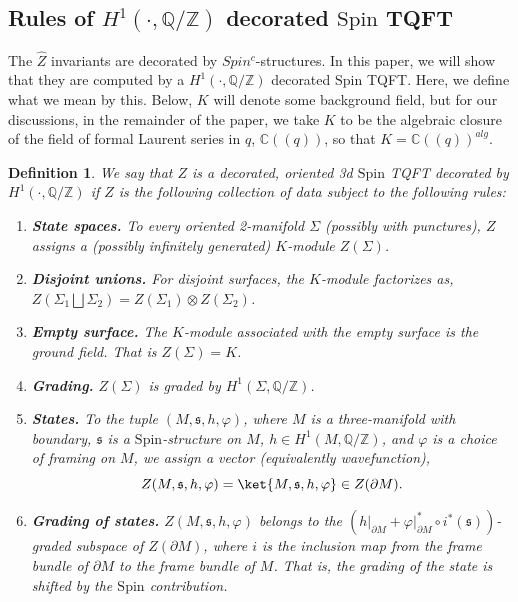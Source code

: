 \documentclass{article}
\newcommand{\Z}{{\mathbb Z}}
\newcommand{\Q}{{\mathbb Q}}
\newtheorem{definition}{Definition}
\numberwithin{corollary}{theorem}
\numberwithin{corollary}{proposition}
\begin{document}


\subsection{Rules of \texorpdfstring{$H^{1}(\cdot, \Q/\Z)$}{H1(.,Q/Z)} decorated \texorpdfstring{$\mathrm{Spin}$}{Spin} TQFT}\label{tqftrules}
The $\hat{Z}$ invariants are decorated by $Spin^c$-structures. In this paper, we will show that they are computed by a $H^{1}(\cdot, \Q/\Z)$ decorated $\mathrm{Spin}$ TQFT. Here, we define what we mean by this. Below, $K$ will denote some background field, but for our discussions, in the remainder of the paper, we take $K$ to be the algebraic closure of the field of formal Laurent series in $q$, $\mathbb{C}((q)) $, so that $K =\mathbb{C}((q))^{alg}$. 
\begin{definition} We say that $Z$ is a decorated, oriented 3d $\mathrm{Spin}$ TQFT decorated by $H^{1}(\cdot,\Q/\Z)$ if $Z$ is the following collection of data subject to the following rules: 
\begin{enumerate}
    \item \textbf{State spaces.} To every oriented 2-manifold $\Sigma$ (possibly with punctures), $Z$ assigns a (possibly infinitely generated) $K$-module $Z(\Sigma)$.
    \item \textbf{Disjoint unions.} For disjoint surfaces, the $K$-module factorizes as, $Z(\Sigma_1 \bigsqcup \Sigma_2) = Z(\Sigma_1) \otimes Z(\Sigma_2)$.
    \item \textbf{Empty surface.} The $K$-module associated with the empty surface is the ground field. That is $Z(\Sigma) = K$.
    \item \textbf{Grading.} $Z(\Sigma)$ is graded by $H^{1}(\Sigma, \Q/\Z)$.
    \item \textbf{States.} To the tuple $(M,\mathfrak{s},h, \varphi)$, where $M$ is a three-manifold with boundary, $\mathfrak{s}$ is a $\mathrm{Spin}$-structure on $M$, $h \in H^{1}(M,\Q/\Z) $, and $\varphi$ is a choice of framing on $M$, we assign a vector (equivalently wavefunction), $$Z(M,\mathfrak{s},h, \varphi) = \ket{M,\mathfrak{s},h, \varphi} \in Z(\partial M).$$
    \item \textbf{Grading of states.} $Z(M,\mathfrak{s},h, \varphi)$ belongs to the $(h\vert_{\partial M} + \varphi\vert_{\partial M}^{*}\circ i^{*}(\mathfrak{s}))$-graded subspace of $Z(\partial M)$, where $i$ is the inclusion map from the frame bundle of $\partial M$ to the frame bundle of $M$. That is, the grading of the state is shifted by the $\mathrm{Spin}$ contribution.

\end{enumerate}
\end{definition}
\end{document}
